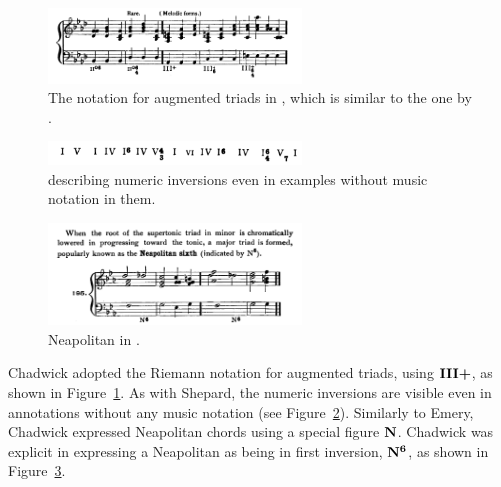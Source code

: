 \begin{figure}[h!]
    \centering
    \includegraphics[width=0.6\textwidth]{figures/chapter/2/primary_sources/chadwick1897harmony053.png}
    \caption{The notation for augmented triads in \textcite{chadwick1897harmony}, which is similar to the one by \textcite{riemann1890katechismus}.}
    \label{fig:chadwick1897harmony053}
\end{figure}

\begin{figure}[h!]
    \centering
    \includegraphics[width=0.6\textwidth]{figures/chapter/2/primary_sources/chadwick1897harmony064.png}
    \caption{\textcite{chadwick1897harmony} describing numeric inversions even in examples without music notation in them.}
    \label{fig:chadwick1897harmony064}
\end{figure}

\begin{figure}[h!]
    \centering
    \includegraphics[width=0.6\textwidth]{figures/chapter/2/primary_sources/chadwick1897harmony148.png}
    \caption{Neapolitan in \textcite{chadwick1897harmony}.}
    \label{fig:chadwick1897harmony148}
\end{figure}

Chadwick adopted the Riemann notation for augmented triads, using $\textbf{III+}\relax\relax$, as shown in Figure~\ref{fig:chadwick1897harmony053}.
As with Shepard, the numeric inversions are visible even in annotations without any music notation (see Figure~\ref{fig:chadwick1897harmony064}).
Similarly to Emery, Chadwick expressed Neapolitan chords using a special figure $\textbf{N}\relax\relax$.
Chadwick was explicit in expressing a Neapolitan as being in first inversion, $\textbf{N}\relax\relax{\footnotesize {}^\textbf{6}\relax\relax}$, as shown in Figure~\ref{fig:chadwick1897harmony148}.

